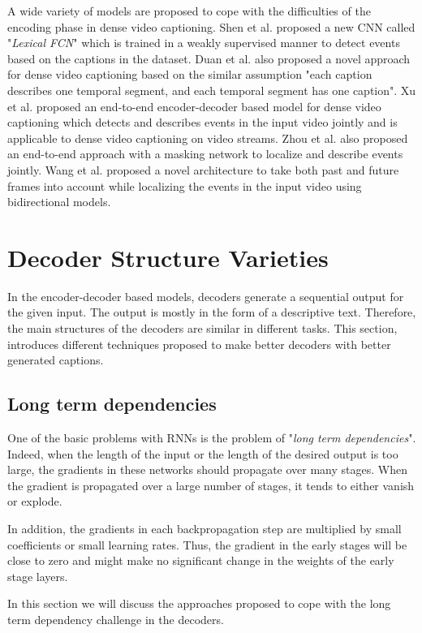 \documentclass[preprint, 12pt]{elsarticle}
\begin{document}
		A wide variety of models are proposed to cope with the difficulties of the encoding phase in dense video captioning. Shen et al. \cite{shen2017weakly} proposed a new CNN called "\textit{Lexical FCN}" which is trained in a weakly supervised manner to detect events based on the captions in the dataset. Duan et al. also proposed a novel approach for dense video captioning based on the similar assumption "each caption describes one temporal segment, and each temporal segment has one caption"\cite{duan2018weakly}. Xu et al. proposed an end-to-end encoder-decoder based model for dense video captioning which detects and describes events in the input video jointly and is applicable to dense video captioning on video streams. Zhou et al. also proposed an end-to-end approach with a masking network to localize and describe events jointly\cite{zhou2018end}. Wang et al. proposed a novel architecture to take both past and future frames into account while localizing the events in the input video \cite{wang2018bidirectional} using bidirectional models. 
	
	\section{Decoder Structure Varieties}
	In the encoder-decoder based models, decoders generate a sequential output for the given input. The output is mostly in the form of a descriptive text. Therefore, the main structures of the decoders are similar in different tasks. This section, introduces different techniques proposed to make better decoders with better generated captions. 
		\subsection{Long term dependencies}
		One of the basic problems with RNNs is the problem of "\textit{long term dependencies}". Indeed, when the length of the input or the length of the desired output is too large, the gradients in these networks  should propagate over many stages. When the gradient is propagated over a large number of stages, it tends to either vanish or explode.
		
		 In addition, the gradients in each backpropagation step are multiplied by small coefficients or small learning rates. Thus, the gradient in the early stages will be close to zero and might make no significant change in the weights of the early stage layers\cite{goodfellow2016deep}. 
		
		In this section we will discuss the approaches proposed to cope with the long term dependency challenge in the decoders.
		
\end{document}
